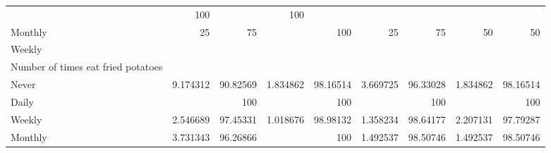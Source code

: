\documentclass{article}
\begin{document}
\begin{tabular}{lllllllll}
  \multicolumn{1}{r}{} &
  \multicolumn{1}{r}{100} &
  \multicolumn{1}{r}{} &
  \multicolumn{1}{r}{100} \\
\multicolumn{1}{l}{\hspace{7em}Monthly} &
  \multicolumn{1}{|r}{25} &
  \multicolumn{1}{r}{75} &
  \multicolumn{1}{r}{} &
  \multicolumn{1}{r}{100} &
  \multicolumn{1}{r}{25} &
  \multicolumn{1}{r}{75} &
  \multicolumn{1}{r}{50} &
  \multicolumn{1}{r}{50} \\
\multicolumn{1}{l}{\hspace{5em}Weekly} &
  \multicolumn{1}{|r}{} &
  \multicolumn{1}{r}{} &
  \multicolumn{1}{r}{} &
  \multicolumn{1}{r}{} &
  \multicolumn{1}{r}{} &
  \multicolumn{1}{r}{} &
  \multicolumn{1}{r}{} &
  \multicolumn{1}{r}{} \\
\multicolumn{1}{l}{\hspace{6em}Number of times eat fried potatoes} &
  \multicolumn{1}{|r}{} &
  \multicolumn{1}{r}{} &
  \multicolumn{1}{r}{} &
  \multicolumn{1}{r}{} &
  \multicolumn{1}{r}{} &
  \multicolumn{1}{r}{} &
  \multicolumn{1}{r}{} &
  \multicolumn{1}{r}{} \\
\multicolumn{1}{l}{\hspace{7em}Never} &
  \multicolumn{1}{|r}{9.174312} &
  \multicolumn{1}{r}{90.82569} &
  \multicolumn{1}{r}{1.834862} &
  \multicolumn{1}{r}{98.16514} &
  \multicolumn{1}{r}{3.669725} &
  \multicolumn{1}{r}{96.33028} &
  \multicolumn{1}{r}{1.834862} &
  \multicolumn{1}{r}{98.16514} \\
\multicolumn{1}{l}{\hspace{7em}Daily} &
  \multicolumn{1}{|r}{} &
  \multicolumn{1}{r}{100} &
  \multicolumn{1}{r}{} &
  \multicolumn{1}{r}{100} &
  \multicolumn{1}{r}{} &
  \multicolumn{1}{r}{100} &
  \multicolumn{1}{r}{} &
  \multicolumn{1}{r}{100} \\
\multicolumn{1}{l}{\hspace{7em}Weekly} &
  \multicolumn{1}{|r}{2.546689} &
  \multicolumn{1}{r}{97.45331} &
  \multicolumn{1}{r}{1.018676} &
  \multicolumn{1}{r}{98.98132} &
  \multicolumn{1}{r}{1.358234} &
  \multicolumn{1}{r}{98.64177} &
  \multicolumn{1}{r}{2.207131} &
  \multicolumn{1}{r}{97.79287} \\
\multicolumn{1}{l}{\hspace{7em}Monthly} &
  \multicolumn{1}{|r}{3.731343} &
  \multicolumn{1}{r}{96.26866} &
  \multicolumn{1}{r}{} &
  \multicolumn{1}{r}{100} &
  \multicolumn{1}{r}{1.492537} &
  \multicolumn{1}{r}{98.50746} &
  \multicolumn{1}{r}{1.492537} &
  \multicolumn{1}{r}{98.50746} \\

\end{tabular}
\end{document}
